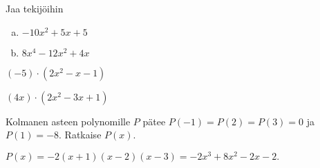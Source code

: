 \Harjoitustehtavat

\begin{tehtava}
  Jaa tekijöihin
  \begin{enumerate}[a)]
    \item $-10x^2+5x+5$
    \item $8x^4-12x^2+4x$
  \end{enumerate}

  \begin{vastaus}
    \item $(-5)\cdot(2x^2-x-1)$
    \item $(4x)\cdot(2x^2-3x+1)$
  \end{vastaus}
\end{tehtava}

\begin{tehtava}
  Kolmanen asteen polynomille $P$ pätee $P(-1)=P(2)=P(3)=0$ ja $P(1)=-8$. Ratkaise $P(x)$.

  \begin{vastaus}
    $P(x)=-2(x+1)(x-2)(x-3)=-2x^3+8x^2-2x-2.$
  \end{vastaus}
\end{tehtava}

